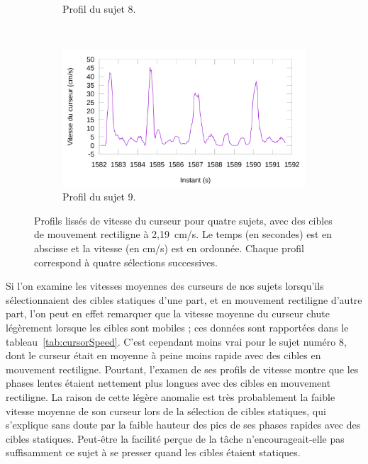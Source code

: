 \begin{figure}[htb]
\begin{subfigure}[t]{\subImgWlineplot}
			\caption{Profil du sujet 8.}
			\label{fig:rectProfile8}
		\end{subfigure}
		~
		\begin{subfigure}[t]{\subImgWlineplot}
			\centering
			\includegraphics[width=\textwidth]{figures/ch4/subject_09_rect_219_smoothed}
			\caption{Profil du sujet 9.}
			\label{fig:rectProfile9}
		\end{subfigure}
		\caption[Profils de vitesse du curseur, cibles de mouvement rectiligne]{Profils lissés de vitesse du curseur pour quatre sujets, avec des cibles de mouvement rectiligne à 2,19~cm/s. Le temps (en secondes) est en abscisse et la vitesse (en cm/s) est en ordonnée. Chaque profil correspond à quatre sélections successives.}
		\label{fig:rectProfiles}
	\end{figure}
	
	Si l'on examine les vitesses moyennes des curseurs de nos sujets lorsqu'ils sélectionnaient des cibles statiques d'une part, et en mouvement rectiligne d'autre part, l'on peut en effet remarquer que la vitesse moyenne du curseur chute légèrement lorsque les cibles sont mobiles ; ces données sont rapportées dans le tableau~\ref{tab:cursorSpeed}. C'est cependant moins vrai pour le sujet numéro 8, dont le curseur était en moyenne à peine moins rapide avec des cibles en mouvement rectiligne. Pourtant, l'examen de ses profils de vitesse montre que les phases lentes étaient nettement plus longues avec des cibles en mouvement rectiligne. La raison de cette légère anomalie est très probablement la faible vitesse moyenne de son curseur lors de la sélection de cibles statiques, qui s'explique sans doute par la faible hauteur des \og pics \fg{} de ses phases rapides avec des cibles statiques. Peut-être la facilité perçue de la tâche n'encourageait-elle pas suffisamment ce sujet à se presser quand les cibles étaient statiques.
	
